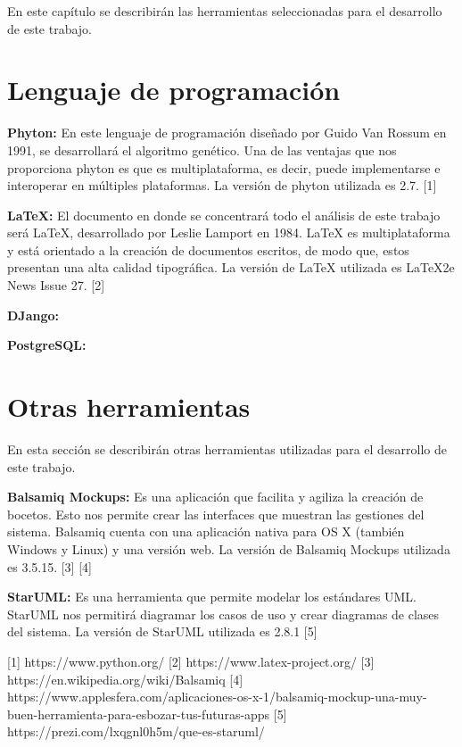 \label{sec:seleccionHerramientas}
	
	En este capítulo se describirán las herramientas seleccionadas para el desarrollo de este trabajo. 
	
	\section{Lenguaje de programación}
		\textbf{Phyton:} En este lenguaje de programación diseñado por Guido Van Rossum en 1991, se desarrollará el algoritmo genético. Una de las ventajas que nos proporciona phyton es que es multiplataforma, es decir, puede implementarse e interoperar en múltiples plataformas. La versión de phyton utilizada es 2.7. [1] 
	
		\textbf{LaTeX:} El documento en donde se concentrará todo el análisis de este trabajo será LaTeX, desarrollado por Leslie Lamport en 1984. LaTeX es multiplataforma y está orientado a la creación de documentos escritos, de modo que, estos  presentan una alta calidad tipográfica. La versión de LaTeX utilizada es LaTeX2e News Issue 27. [2]
		
		\textbf{DJango:}
		
		\textbf{PostgreSQL:}
	
	\section{Otras herramientas}
		En esta sección se describirán otras herramientas utilizadas para el desarrollo de este trabajo.
		
		\textbf{Balsamiq Mockups:} Es una aplicación que facilita y agiliza la creación de bocetos. Esto nos permite crear las interfaces que muestran las gestiones del sistema. Balsamiq cuenta con una aplicación nativa para OS X (también Windows y Linux) y una versión web. La versión de Balsamiq Mockups utilizada es 3.5.15. [3] [4]
		
		\textbf{StarUML:} Es una herramienta que permite modelar los estándares UML. StarUML nos permitirá diagramar los casos de uso y crear diagramas de clases del sistema. La versión de StarUML utilizada es 2.8.1 [5]


	
	


	[1] https://www.python.org/
	[2] https://www.latex-project.org/
	[3] https://en.wikipedia.org/wiki/Balsamiq 
	[4] https://www.applesfera.com/aplicaciones-os-x-1/balsamiq-mockup-una-muy-buen-herramienta-para-esbozar-tus-futuras-apps
	[5] https://prezi.com/lxqgnl0h5m/que-es-staruml/